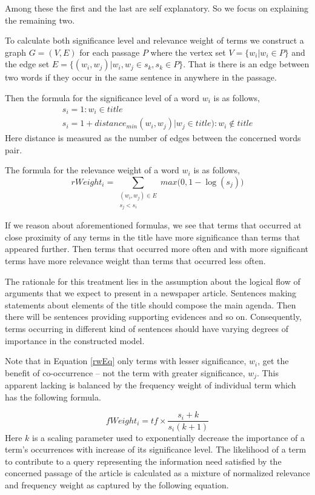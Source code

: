 \documentclass[article]{IEEEtran}
\begin{document}
Among these the first and the last are self explanatory. So we focus on explaining the remaining two.

To calculate both significance level and relevance weight of terms we construct a graph ${G = (V, E)}$ for each passage $P$ where the vertex set $V = \{w_i | w_i \in P\}$ and the edge set $E = \{(w_i, w_j) | w_i, w_j \in s_k, s_k \in P\}$. That is there is an edge between two words if they occur in the same sentence in anywhere in the passage.  

Then the formula for the significance level of a word $w_i$ is as follows, 
\begin{equation}
\begin{array}{lr}
s_i = 1 : w_i \in title \\
s_i = 1 + distance_{min}(w_i, w_j) | w_j \in title) : w_i \notin title
\end{array}
\end{equation}
Here distance is measured as the number of edges between the concerned words pair.  

The formula for the relevance weight of a word $w_i$ is as follows, 
\begin{equation}
\label{rwEq}
rWeight_i = \sum_{\substack{(w_i, w_j) \in E\\s_j < s_i}} max\big(0, 1 - \log(s_j)\big)
\end{equation}
 

If we reason about aforementioned formulas, we see that terms that occurred at close proximity of any terms in the title have more significance than terms that appeared further. Then terms that occurred more often and with more significant terms have more relevance weight than terms that occurred less often.  

The rationale for this treatment lies in the assumption about the logical flow of arguments that we expect to present in a newspaper article. Sentences making statements about elements of the title should compose the main agenda. Then there will be sentences providing supporting evidences and so on. Consequently, terms occurring in different kind of sentences should have varying degrees of importance in the constructed model.   

Note that in Equation \ref{rwEq} only terms with lesser significance, $w_i$, get the benefit of co-occurrence -- not the term with greater significance, $w_j$. This apparent lacking is balanced by the frequency weight of individual term which has the following formula.

\begin{equation}
fWeight_i = tf \times {\frac{s_i + k}{s_i (k + 1)}}
\end{equation}   
Here $k$ is a scaling parameter used to exponentially decrease the importance of a term's occurrences with increase of its significance level.
The likelihood of a term to contribute to a query representing the information need satisfied by the concerned passage of the article is calculated as a mixture of normalized relevance and frequency weight as captured by the following equation.
\end{document}
